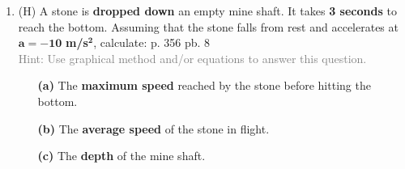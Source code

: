 \documentclass[A4,12pt]{article}
\begin{document}
\begin{enumerate}[label=\bfseries (\arabic*)]
\item (H) A stone is \textbf{dropped down} an empty mine shaft. It takes \textbf{3 seconds} to reach the bottom. Assuming that the stone falls from rest and accelerates at $\bm{a = -10 }$\textbf{ m/s}$\bm{^2}$, calculate: \cite{CCEADA} p. 356 pb. 8\\
\textcolor{gray}{Hint: Use graphical method and/or equations to answer this question.}
%
\begin{itemize}
    \item[\bf (a)] The \textbf{maximum speed} reached by the stone before hitting the bottom.
    \item[\bf (b)] The \textbf{average speed} of the stone in flight.
    \item[\bf (c)] The \textbf{depth} of the mine shaft.
\end{itemize}























\end{enumerate}
\end{document}
